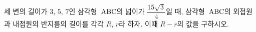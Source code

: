 세 변의 길이가 $3$, $5$, $7$인 삼각형~$\mathrm{ABC}$의 넓이가 $\dfrac{15\sqrt{3}}{4}$일 때, 삼각형~$\mathrm{ABC}$의 외접원과 내접원의 반지름의 길이를 각각 $R$, $r$라 하자. 이때 $R-r$의 값을 구하시오.
